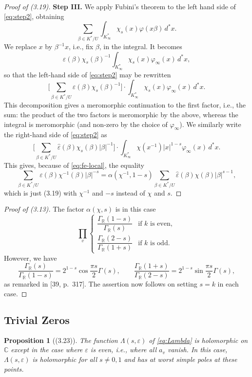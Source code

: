 \documentclass[12pt,a4paper]{article}
\theoremstyle{plain}
\newtheorem{proposition}[theorem]{Proposition}
\theoremstyle{definition}
\newcommand{\R}{\mathbb{R}}
\newcommand{\C}{\mathbb{C}}
\begin{document}
\begin{proof}[Proof of (3.19)]
\textbf{Step III.} We apply Fubini's theorem to the left hand side of \eqref{eq:step2}, obtaining
\[
\sum_{\beta\in K^*/U}\int_{K_{\infty}^*}\chi_s(x)\varphi(x\beta)\,d^*x.
\]
We replace $x$ by $\beta^{-1}x$, i.e., fix $\beta$, in the integral. It becomes
\[
\varepsilon(\beta)\chi_s(\beta)^{-1}\int_{K_{\infty}^*}\chi_s(x)\varphi_{\infty}(x)\,d^*x,
\]
so that the left-hand side of \eqref{eq:step2} may be rewritten
\[
\Big[\sum_{\beta\in K^*/U}\varepsilon(\beta)\chi_s(\beta)^{-1}\Big]\cdot\int_{K_{\infty}^*}\chi_s(x)\varphi_{\infty}(x)\,d^*x.
\]
This decomposition gives a meromorphic continuation to the first factor, i.e., the sum: the product of the two factors is meromorphic by the above, whereas the integral is meromorphic (and non-zero by the choice of $\varphi_{\infty}$). We similarly write the right-hand side of \eqref{eq:step2} as
\[
\Big[\sum_{\beta\in K^*/U}\hat{\varepsilon}(\beta)\chi_s(\beta)|\beta|^{-1}\Big]\cdot\int_{K_{\infty}^*}\chi(x^{-1})|x|^{1-s}\varphi_{\infty}(x)\,d^*x.
\]
This gives, because of \eqref{eq:fe-local}, the equality
\[
\sum_{\beta\in K^*/U}\varepsilon(\beta)\chi^{-1}(\beta)|\beta|^{-s}=\alpha(\chi^{-1},1-s)\sum_{\beta\in K^*/U}\hat{\varepsilon}(\beta)\chi(\beta)|\beta|^{s-1},
\]
which is just (3.19) with $\chi^{-1}$ and $-s$ instead of $\chi$ and $s$.
\end{proof}

\begin{proof}[Proof of (3.13)]
The factor $\alpha(\chi,s)$ is in this case
\[
\prod_v\begin{cases}
\dfrac{\Gamma_{\R}(1-s)}{\Gamma_{\R}(s)} & \text{if $k$ is even},\\[1em]
\dfrac{\Gamma_{\R}(2-s)}{\Gamma_{\R}(1+s)} & \text{if $k$ is odd}.
\end{cases}
\]
However, we have
\[
\frac{\Gamma_{\R}(s)}{\Gamma_{\R}(1-s)}=2^{1-s}\cos\frac{\pi s}{2}\Gamma(s),\qquad\frac{\Gamma_{\R}(1+s)}{\Gamma_{\R}(2-s)}=2^{1-s}\sin\frac{\pi s}{2}\Gamma(s),
\]
as remarked in [39, p.~317]. The assertion now follows on setting $s=k$ in each case.
\end{proof}

\subsection*{Trivial Zeros}

\begin{proposition}[(3.23)]\label{prop:trivial}
The function $\Lambda(s,\varepsilon)$ of \eqref{eq:Lambda} is holomorphic on $\C$ except in the case where $\varepsilon$ is even, i.e., where all $a_v$ vanish. In this case, $\Lambda(s,\varepsilon)$ is holomorphic for all $s\neq0,1$ and has at worst simple poles at these points.
\end{proposition}
\end{document}
